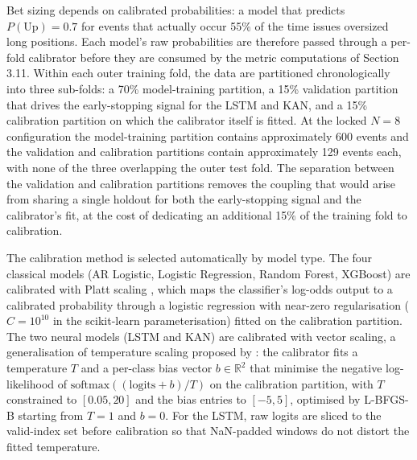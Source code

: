 \documentclass[12pt,a4paper,oneside]{article}
\begin{document}
Bet sizing depends on calibrated probabilities: a model that predicts $P(\text{Up}) = 0.7$ for events that actually occur 55\% of the time issues oversized long positions. Each model's raw probabilities are therefore passed through a per-fold calibrator before they are consumed by the metric computations of Section 3.11. Within each outer training fold, the data are partitioned chronologically into three sub-folds: a 70\% model-training partition, a 15\% validation partition that drives the early-stopping signal for the LSTM and KAN, and a 15\% calibration partition on which the calibrator itself is fitted. At the locked $N = 8$ configuration the model-training partition contains approximately 600 events and the validation and calibration partitions contain approximately 129 events each, with none of the three overlapping the outer test fold. The separation between the validation and calibration partitions removes the coupling that would arise from sharing a single holdout for both the early-stopping signal and the calibrator's fit, at the cost of dedicating an additional 15\% of the training fold to calibration.

The calibration method is selected automatically by model type. The four classical models (AR Logistic, Logistic Regression, Random Forest, XGBoost) are calibrated with Platt scaling \citep{platt_1999}, which maps the classifier's log-odds output to a calibrated probability through a logistic regression with near-zero regularisation ($C = 10^{10}$ in the scikit-learn parameterisation) fitted on the calibration partition. The two neural models (LSTM and KAN) are calibrated with vector scaling, a generalisation of temperature scaling proposed by \citet[Section 4.2]{guo_temperature_2017}: the calibrator fits a temperature $T$ and a per-class bias vector $b \in \mathbb{R}^{2}$ that minimise the negative log-likelihood of $\text{softmax}((\text{logits} + b) / T)$ on the calibration partition, with $T$ constrained to $[0.05, 20]$ and the bias entries to $[-5, 5]$, optimised by L-BFGS-B starting from $T = 1$ and $b = 0$. For the LSTM, raw logits are sliced to the valid-index set before calibration so that NaN-padded windows do not distort the fitted temperature.
\end{document}
